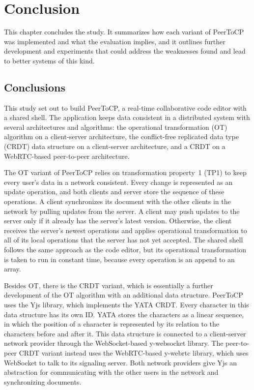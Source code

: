 \chapter{Conclusion}
\label{bab:6}

This chapter concludes the study. It summarizes how each variant of PeerToCP was implemented and what the evaluation implies, and it outlines further development and experiments that could address the weaknesses found and lead to better systems of this kind.

\section{Conclusions}
\label{sec:kesimpulan}

This study set out to build PeerToCP, a real-time collaborative code editor with a shared shell. The application keeps data consistent in a distributed system with several architectures and algorithms: the operational transformation (OT) algorithm on a client-server architecture, the conflict-free replicated data type (CRDT) data structure on a client-server architecture, and a CRDT on a WebRTC-based peer-to-peer architecture.

The OT variant of PeerToCP relies on transformation property~1 (TP1) to keep every user's data in a network consistent. Every change is represented as an update operation, and both clients and server store the sequence of these operations. A client synchronizes its document with the other clients in the network by pulling updates from the server. A client may push updates to the server only if it already has the server's latest version. Otherwise, the client receives the server's newest operations and applies operational transformation to all of its local operations that the server has not yet accepted. The shared shell follows the same approach as the code editor, but its operational transformation is taken to run in constant time, because every operation is an append to an array.

Besides OT, there is the CRDT variant, which is essentially a further development of the OT algorithm with an additional data structure. PeerToCP uses the Yjs library, which implements the YATA CRDT. Every character in this data structure has its own ID. YATA stores the characters as a linear sequence, in which the position of a character is represented by its relation to the characters before and after it. This data structure is connected to a client-server network provider through the WebSocket-based y-websocket library. The peer-to-peer CRDT variant instead uses the WebRTC-based y-webrtc library, which uses WebSocket to talk to its signaling server. Both network providers give Yjs an abstraction for communicating with the other users in the network and synchronizing documents.

